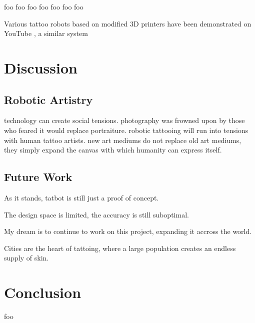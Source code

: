 \documentclass[11pt]{article}
\begin{document}
foo \cite{NietoBastida2023}
foo \cite{arar2025swiftsketch}
foo \cite{carlier2020deepsvg}
foo \cite{mellor2020unsupervised}
foo \cite{ha2017neural}
foo \cite{huang2019learning}
foo \cite{kotani2019teaching}

Various tattoo robots based on modified 3D printers have been demonstrated on YouTube \cite{EmilyTheEngineer2025}, a similar system \cite{YamanDeif2021}

\section{Discussion}

\subsection{Robotic Artistry}

technology can create social tensions.
photography was frowned upon by those who feared it would replace portraiture.
robotic tattooing will run into tensions with human tattoo artists.
new art mediums do not replace old art mediums, they simply expand the canvas with which humanity can express itself.

\subsection{Future Work}

As it stands, tatbot is still just a proof of concept.

The design space is limited, the accuracy is still suboptimal.

My dream is to continue to work on this project, expanding it accross the world.

Cities are the heart of tattoing, where a large population creates an endless supply of skin.

\section{Conclusion}

foo



\end{document}
